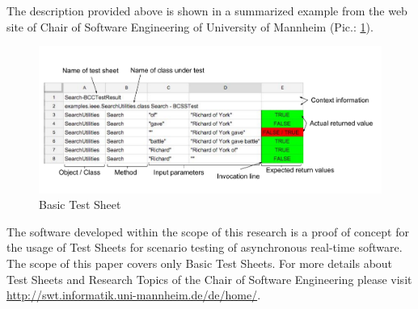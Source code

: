The description provided above is shown in a summarized example from the web site of Chair of Software Engineering of University of Mannheim (Pic.: \ref{fig:BasictestSheet}).
  \begin{figure}[ht]
  	\label{fig:BasictestSheet}
    \centering
    \includegraphics[width=\textwidth]{grafiken/basic_test_sheet}
     \caption{Basic Test Sheet}
  \end{figure}



The software developed within the scope of this research is a proof of concept for the usage of Test Sheets for scenario testing of asynchronous real-time software. The scope of this paper covers only Basic Test Sheets. For more details about Test Sheets and Research Topics of the Chair of Software Engineering please visit \url{http://swt.informatik.uni-mannheim.de/de/home/}.



